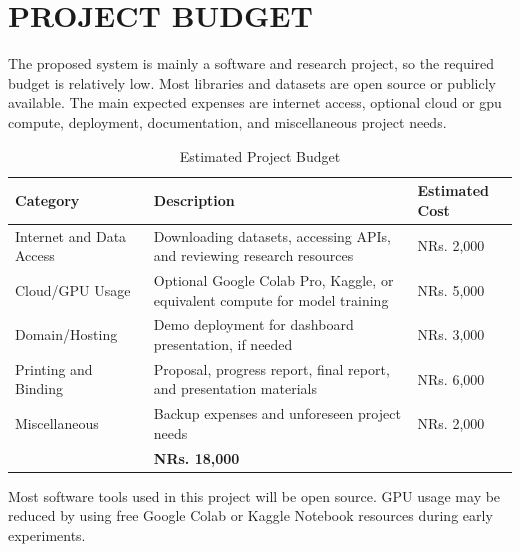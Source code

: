 \chapter{PROJECT BUDGET}

The proposed system is mainly a software and research project, so the required budget is relatively low. Most libraries and datasets are open source or publicly available. The main expected expenses are internet access, optional cloud or \gls{gpu} compute, deployment, documentation, and miscellaneous project needs.

\begin{table}[H]
    \centering
    \small
    \caption{Estimated Project Budget}
    \label{tab:project_budget}
    \renewcommand{\arraystretch}{1.2}
    \setlength{\tabcolsep}{4pt}

    \begin{tabularx}{0.94\linewidth}{|
        >{\raggedright\arraybackslash}p{3.2cm}|
        >{\raggedright\arraybackslash}X|
        >{\raggedleft\arraybackslash}p{2.8cm}|}
        \hline
        \textbf{Category} & \textbf{Description} & \textbf{Estimated Cost} \\
        \hline

        Internet and Data Access &
        Downloading datasets, accessing APIs, and reviewing research resources &
        NRs. 2,000 \\
        \hline

        Cloud/GPU Usage &
        Optional Google Colab Pro, Kaggle, or equivalent compute for model training &
        NRs. 5,000 \\
        \hline

        Domain/Hosting &
        Demo deployment for dashboard presentation, if needed &
        NRs. 3,000 \\
        \hline

        Printing and Binding &
        Proposal, progress report, final report, and presentation materials &
        NRs. 6,000 \\
        \hline

        Miscellaneous &
        Backup expenses and unforeseen project needs &
        NRs. 2,000 \\
        \hline

        \multicolumn{2}{|r|}{\textbf{Total Estimated Cost}} &
        \textbf{NRs. 18,000} \\
        \hline
    \end{tabularx}
\end{table}

Most software tools used in this project will be open source. GPU usage may be reduced by using free Google Colab or Kaggle Notebook resources during early experiments.
